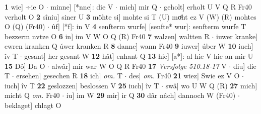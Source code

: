 \documentclass[8pt,a4paper,notitlepage]{article}
\begin{document}
\begin{table}[ht]
\begin{minipage}[t]{0.5\linewidth}
\textbf{1} wie] ÷ie O  $\cdot$ minne] [*nne]: die V  $\cdot$ mich] mir Q  $\cdot$ geholt] erholt U V Q R Fr40 verholt O \textbf{2} sîniu] siner U \textbf{3} möhte si] mohte si T (U) moͤht ez V (W) (R) mohtes O (Q) (Fr40)  $\cdot$ ûf] [*f]: in V \textbf{4} senfterm wurfe] [senfte* wur]: senfterm wurfe T bezzerm nvtze O \textbf{6} in] im V W O Q (R) Fr40 \textbf{7} walzen] waltten R  $\cdot$ iuwer kranke] ewren kranken Q úwer kranken R \textbf{8} danne] wann Fr40 \textbf{9} iuwer] úber W \textbf{10} iuch] îv T  $\cdot$ gesant] her gesant W \textbf{12} hât] enhant Q \textbf{13} hie] [a*]: al hie V hie an mir U \textbf{15} Dô] Da O  $\cdot$ alwâr] mir war W O Q R Fr40 \textbf{17} \textit{Versfolge 510.18-17} V   $\cdot$ diu] die T  $\cdot$ ersehen] gesechen R \textbf{18} ich] \textit{om.} T  $\cdot$ des] \textit{om.} Fr40 \textbf{21} wiez] Swie ez V O  $\cdot$ iuch] îv T \textbf{22} geslozzen] beslossen V \textbf{25} iuch] îv T  $\cdot$ swâ] wo U W Q (R) \textbf{27} mich] micht Q \textit{om.} Fr40  $\cdot$ iu] im W \textbf{29} mir] ir Q \textbf{30} dâr nâch] dannoch W (Fr40)  $\cdot$ beklaget] chlagt O \newline
\end{minipage}
\end{table}
\end{document}
